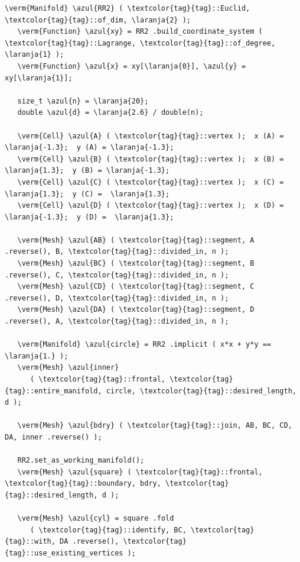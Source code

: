 \begin{Verbatim}[commandchars=\\\{\},formatcom=\small\tt,frame=single,
   label=parag-\ref{\numb section 7.\numb parag 19}.cpp,rulecolor=\color{moldura},
   baselinestretch=0.94,framesep=2mm                                             ]
   \verm{Manifold} \azul{RR2} ( \textcolor{tag}{tag}::Euclid, \textcolor{tag}{tag}::of_dim, \laranja{2} );
   \verm{Function} \azul{xy} = RR2 .build_coordinate_system ( \textcolor{tag}{tag}::Lagrange, \textcolor{tag}{tag}::of_degree, \laranja{1} );
   \verm{Function} \azul{x} = xy[\laranja{0}], \azul{y} = xy[\laranja{1}];

   size_t \azul{n} = \laranja{20};
   double \azul{d} = \laranja{2.6} / double(n);

   \verm{Cell} \azul{A} ( \textcolor{tag}{tag}::vertex );  x (A) = \laranja{-1.3};  y (A) = \laranja{-1.3};
   \verm{Cell} \azul{B} ( \textcolor{tag}{tag}::vertex );  x (B) =  \laranja{1.3};  y (B) = \laranja{-1.3};
   \verm{Cell} \azul{C} ( \textcolor{tag}{tag}::vertex );  x (C) =  \laranja{1.3};  y (C) =  \laranja{1.3};
   \verm{Cell} \azul{D} ( \textcolor{tag}{tag}::vertex );  x (D) = \laranja{-1.3};  y (D) =  \laranja{1.3};

   \verm{Mesh} \azul{AB} ( \textcolor{tag}{tag}::segment, A .reverse(), B, \textcolor{tag}{tag}::divided_in, n );
   \verm{Mesh} \azul{BC} ( \textcolor{tag}{tag}::segment, B .reverse(), C, \textcolor{tag}{tag}::divided_in, n );
   \verm{Mesh} \azul{CD} ( \textcolor{tag}{tag}::segment, C .reverse(), D, \textcolor{tag}{tag}::divided_in, n );
   \verm{Mesh} \azul{DA} ( \textcolor{tag}{tag}::segment, D .reverse(), A, \textcolor{tag}{tag}::divided_in, n );

   \verm{Manifold} \azul{circle} = RR2 .implicit ( x*x + y*y == \laranja{1.} );
   \verm{Mesh} \azul{inner}
      ( \textcolor{tag}{tag}::frontal, \textcolor{tag}{tag}::entire_manifold, circle, \textcolor{tag}{tag}::desired_length, d );

   \verm{Mesh} \azul{bdry} ( \textcolor{tag}{tag}::join, AB, BC, CD, DA, inner .reverse() );

   RR2.set_as_working_manifold();
   \verm{Mesh} \azul{square} ( \textcolor{tag}{tag}::frontal, \textcolor{tag}{tag}::boundary, bdry, \textcolor{tag}{tag}::desired_length, d );

   \verm{Mesh} \azul{cyl} = square .fold
      ( \textcolor{tag}{tag}::identify, BC, \textcolor{tag}{tag}::with, DA .reverse(), \textcolor{tag}{tag}::use_existing_vertices );
\end{Verbatim}

